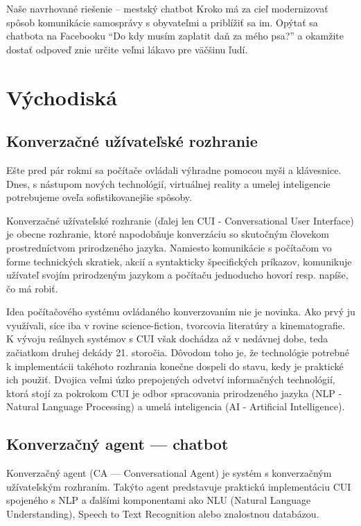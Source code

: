 \documentclass{ExcelAtFIT}
\begin{document}

Naše navrhované riešenie -- mestský chatbot Kroko má za cieľ modernizovať spôsob komunikácie samosprávy s obyvateľmi a priblížiť sa im. Opýtať sa chatbota na Facebooku ``Do kdy musím zaplatit daň za mého psa?'' a okamžite dostať odpoveď znie určite veľmi lákavo pre väčšinu ľudí.


\section{Východiská}


\subsection{Konverzačné užívateľské rozhranie}
Ešte pred pár rokmi sa počítače ovládali výhradne pomocou myši a klávesnice. Dnes, s nástupom nových technológií, virtuálnej reality a umelej inteligencie potrebujeme oveľa sofistikovanejšie spôsoby.

Konverzačné užívateľské rozhranie (ďalej len CUI - Conversational User Interface) je obecne rozhranie, ktoré napodobňuje konverzáciu so skutočným človekom prostredníctvom prirodzeného jazyka. \cite{brownlee_2018} Namiesto komunikácie s počítačom vo forme technických skratiek, akcií a syntakticky špecifických príkazov, komunikuje užívateľ svojím prirodzeným jazykom a počítaču jednoducho hovorí resp. napíše, čo má robiť.

Idea počítačového systému ovládaného konverzovaním nie je novinka. Ako prvý ju využívali, síce iba v rovine science-fiction, tvorcovia literatúry a kinematografie. K vývoju reálnych systémov s CUI však dochádza až v nedávnej dobe, teda začiatkom druhej dekády 21. storočia. \cite{mielke_2016} Dôvodom toho je, že technológie potrebné k implementácii takéhoto rozhrania konečne dospeli do stavu, kedy je praktické ich použiť. Dvojica veľmi úzko prepojených odvetví informačných technológií, ktorá stojí za pokrokom CUI je odbor spracovania prirodzeného jazyka (NLP - Natural Language Processing) a umelá inteligencia (AI - Artificial Intelligence).

\subsection{Konverzačný agent --- chatbot}
Konverzačný agent (CA --- Conversational Agent) je systém s konverzačným
užívateľským rozhraním. Takýto agent predstavuje praktickú implementáciu CUI spojeného s NLP a ďalšími komponentami ako NLU (Natural Language Understanding), Speech to Text Recognition alebo znalostnou databázou.
\end{document}
